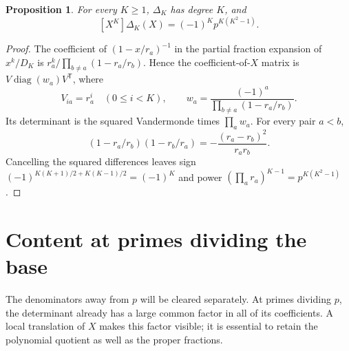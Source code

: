 \documentclass[11pt,letterpaper]{article}
\numberwithin{equation}{section}
\newtheorem{proposition}[theorem]{Proposition}
\theoremstyle{remark}\newtheorem{remark}[theorem]{Remark}
\begin{document}
\begin{proposition}\label{prop:degree}
For every $K\ge1$, $\Delta_K$ has degree $K$, and
\begin{equation}\label{eq:leading}
 [X^K]\Delta_K(X)=(-1)^Kp^{K(K^2-1)}.
\end{equation}
\end{proposition}
\begin{proof}
The coefficient of $(1-x/r_a)^{-1}$ in the partial fraction expansion of $x^k/D_K$ is
$r_a^k/\prod_{b\ne a}(1-r_a/r_b)$. Hence the coefficient-of-$X$ matrix is $V\operatorname{diag}(w_a)V^{\mathsf T}$, where
\begin{equation*}
 V_{ia}=r_a^i\quad(0\le i<K),\qquad
 w_a=\frac{(-1)^a}{\prod_{b\ne a}(1-r_a/r_b)}.
\end{equation*}
Its determinant is the squared Vandermonde times $\prod_a w_a$. For every pair $a<b$,
\begin{equation*}
 (1-r_a/r_b)(1-r_b/r_a)=-\frac{(r_a-r_b)^2}{r_ar_b}.
\end{equation*}
Cancelling the squared differences leaves sign
$(-1)^{K(K+1)/2+K(K-1)/2}=(-1)^K$ and power
$(\prod_a r_a)^{K-1}=p^{K(K^2-1)}$.
\end{proof}

\section{Content at primes dividing the base}
The denominators away from $p$ will be cleared separately. At primes dividing $p$, the determinant already has a large common factor in all of its coefficients. A local translation of $X$ makes this factor visible; it is essential to retain the polynomial quotient as well as the proper fractions.
\end{document}
